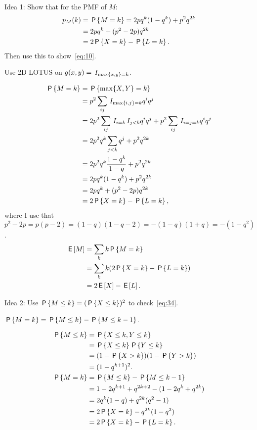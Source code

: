 \documentclass[a4paper,11pt]{article}
\begin{document}
\begin{exercise}\label{ex:1}
Idea 1: Show that for the PMF of $M$: 
\begin{align}
p_M(k) &= \P{M=k} = 2 pq^{k}(1-q^{k}) + p^2q^{2k} \\
&=2 pq^{k} +(p^{2}-2p) q^{2k} \label{eq:18}\\
&=2 \P{X=k} - \P{L=k}. \label{eq:34}
\end{align}
Then use this to show~\cref{eq:10}.
\begin{hint}
  Use 2D LOTUS on $g(x,y) = \1{\max{x, y} = k}$.
\end{hint}
\begin{solution}
  \begin{align}
    \label{eq:14}
\P{M=k}     
&= \P{\max{X, Y} = k} \\
&=p^{2}\sum_{ij}\1{\max{i,j} =k} q^i q^j\\
&=2 p^{2}\sum_{ij}\1{i=k}\1{j < k} q^i q^j + p^{2}\sum_{ij}\1{i=j=k} q^{i} q^j \\
&=2 p^{2}q^{k}\sum_{j < k} q^j + p^{2}q^{2k}\\
&=2 p^{2}q^{k}\frac{1-q^{k}}{1-q} +  p^{2}q^{2k}\\
&=2 pq^{k}(1-q^{k}) + p^{2}q^{2k}\\
&=2 pq^{k} +(p^{2}-2p) q^{2k} \label{eq:18}\\
&=2 \P{X=k} - \P{L=k},
  \end{align}
where I use that $p^{2}-2p = p(p-2) = (1-q)(1-q-2)=-(1-q)(1+q)=-(1-q^{2})$.
  \begin{align}
    \label{eq:15}
\E M 
&= \sum_k k \P{M=k}     \\
&=  \sum_{k}k (2\P{X=k} - \P{L=k}) \\
&= 2 \E X  - \E L.
  \end{align}
\end{solution}
\end{exercise}

\begin{exercise}
Idea 2: Use  $\P{M\leq k} = (\P{X\leq k})^{2}$  to check~\cref{eq:34}.
\begin{hint}
$\P{M=k} = \P{M\leq k} - \P{M\leq k-1}$.
\end{hint}
\begin{solution}
  \begin{align}
    \label{eq:16}
\P{M\leq k}   
&= \P{X\leq k, Y\leq k} \\
&= \P{X\leq k}\P{Y\leq k} \\
&= (1-\P{X> k})(1-\P{Y> k}) \\
&= (1-q^{k+1})^{2}.\\
\P{M=k} &= \P{M\leq k} - \P{M\leq k-1}\\
&= 1-2 q^{k+1} + q^{2k+2} - (1 - 2q^{k} + q^{2k})\\
&= 2 q^{k}(1-q) + q^{2k}(q^{2}-1) \\
&= 2 \P{X=k}  - q^{2k}(1-q^{2}) \\
&= 2 \P{X=k}  - \P{L=k}.
  \end{align}
\end{solution}
\end{exercise}
\end{document}
